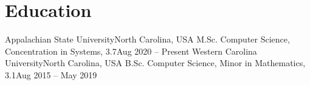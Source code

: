 \section{Education}
  \resumeSubHeadingListStart
    \resumeSubheading
      {Appalachian State University}{North Carolina, USA}
      {M.Sc. Computer Science, Concentration in Systems, 3.7}{Aug 2020 -- Present}
      \resumeItemListStart
      \resumeItemListEnd
    \resumeSubheading
      {Western Carolina University}{North Carolina, USA}
      {B.Sc. Computer Science, Minor in Mathematics, 3.1}{Aug 2015 -- May 2019}
      \resumeItemListStart
      \resumeItemListEnd
  \resumeSubHeadingListEnd